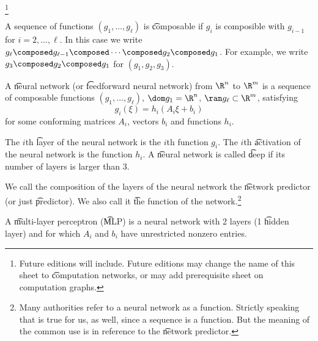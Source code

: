 
\footnote{Future editions will include. Future editions may change the name of this sheet to \t{computation networks}, or may add prerequisite sheet on computation graphs.}


A sequence of functions $(g_1, \dots, g_\ell)$ is \t{composable} if $g_i$ is composible with $g_{i-1}$ for $i = 2, \dots, \ell$.
In this case we write $g_\ell \composed g_{\ell-1} \composed \cdots \composed g_2 \composed g_1$. For example, we write $g_3 \composed g_2 \composed g_1$ for $(g_1, g_2, g_3)$.

A \t{neural network} (or \t{feedforward neural network}) from $\R^n$ to $\R^m$ is a sequence of composable functions $(g_1, \dots, g_{\ell})$, $\dom g_1 = \R^n$, $\ran g_\ell \subset \R^m$, satisfying
\[
  g_i(\xi) = h_i(A_i \xi + b_i)
\]
for some conforming matrices $A_i$, vectors $b_i$ and functions $h_i$.

The $i$th \t{layer} of the neural network is the $i$th function $g_i$.
The $i$th \t{activation} of the neural network is the function $h_i$.
A \t{neural network} is called \t{deep} if its number of layers is larger than 3.

We call the composition of the layers of the neural network the \t{network predictor} (or just \t{predictor}).
We also call it \t{the function} of the network.\footnote{Many authorities refer to a neural network as a function. Strictly speaking that is true for us, as well, since a sequence is a function. But the meaning of the common use is in reference to the \t{network predictor}.}

A \t{multi-layer perceptron} (\t{MLP}) is a neural network with 2 layers (1 \t{hidden layer}) and for which $A_i$ and $b_i$ have unrestricted nonzero entries.


%
%
%

\blankpage
